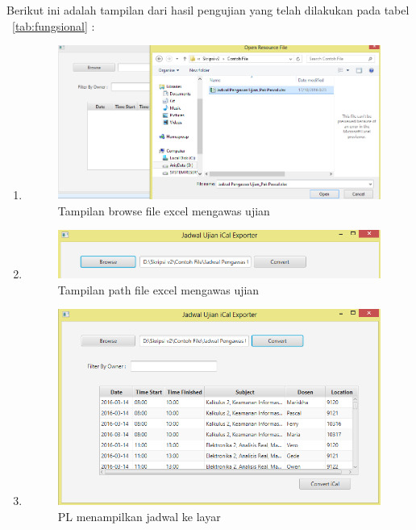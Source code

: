 Berikut ini adalah tampilan dari hasil pengujian yang telah dilakukan pada tabel ~\ref{tab:fungsional} :
\begin{enumerate}
	\item
		\begin{figure}[H]
		\centering
		\includegraphics[scale=0.7]{Gambar/browseFile}
		\caption{Tampilan browse file excel mengawas ujian}
		\label{fig:browseFile}
		\end{figure}
	\item
		\begin{figure}[H]
		\centering
		\includegraphics[scale=0.8]{Gambar/pathFile}
		\caption{Tampilan path file excel mengawas ujian}
		\label{fig:pathFile}
		\end{figure}
	\item 
		\begin{figure}[H]
		\centering
		\includegraphics[scale=0.7]{Gambar/implementAntarmuka2}
		\caption{PL menampilkan jadwal ke layar}

\end{figure}
\end{enumerate}
